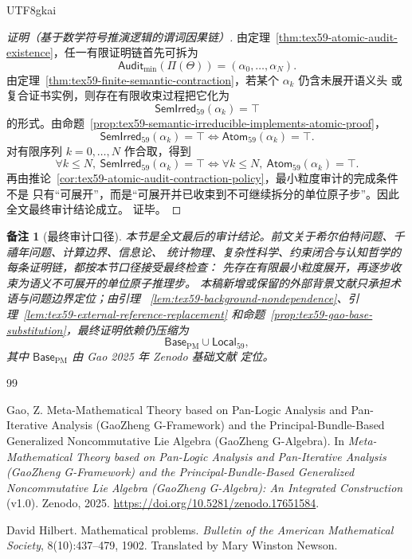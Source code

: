 \documentclass[12pt]{article}
\newtheorem{remark}{备注}[section]
\begin{document}
\begin{CJK*}{UTF8}{gkai}
\begin{proof}[证明（基于数学符号推演逻辑的谓词因果链）]
由定理~\ref{thm:tex59-atomic-audit-existence}，任一有限证明链首先可拆为
\[
  \mathsf{Audit}_{\min}(\Pi(\Theta))
  =
  (\alpha_0,\ldots,\alpha_N).
\]
由定理~\ref{thm:tex59-finite-semantic-contraction}，若某个 \(\alpha_k\) 仍含未展开语义头
或复合证书实例，则存在有限收束过程把它化为
\[
  \mathsf{SemIrred}_{59}(\alpha_k)=\top
\]
的形式。由命题~\ref{prop:tex59-semantic-irreducible-implements-atomic-proof}，
\[
  \mathsf{SemIrred}_{59}(\alpha_k)=\top
  \Longleftrightarrow
  \mathsf{Atom}_{59}(\alpha_k)=\top.
\]
对有限序列 \(k=0,\ldots,N\) 作合取，得到
\[
  \forall k\le N,\ 
  \mathsf{SemIrred}_{59}(\alpha_k)=\top
  \Longleftrightarrow
  \forall k\le N,\ 
  \mathsf{Atom}_{59}(\alpha_k)=\top.
\]
再由推论~\ref{cor:tex59-atomic-audit-contraction-policy}，最小粒度审计的完成条件不是
只有“可展开”，而是“可展开并已收束到不可继续拆分的单位原子步”。因此全文最终审计结论成立。
证毕。
\end{proof}

\begin{remark}[最终审计口径]
本节是全文最后的审计结论。前文关于希尔伯特问题、千禧年问题、计算边界、信息论、
统计物理、复杂性科学、约束闭合与认知哲学的每条证明链，都按本节口径接受最终检查：
先存在有限最小粒度展开，再逐步收束为语义不可展开的单位原子推理步。
本稿新增或保留的外部背景文献只承担术语与问题边界定位；由引理
~\ref{lem:tex59-background-nondependence}、引理~\ref{lem:tex59-external-reference-replacement}
和命题~\ref{prop:tex59-gao-base-substitution}，最终证明依赖仍压缩为
\[
  \mathsf{Base}_{\mathrm{PM}}\cup\mathsf{Local}_{59},
\]
其中 \(\mathsf{Base}_{\mathrm{PM}}\) 由 Gao 2025 年 Zenodo 基础文献
\cite{Gao2025PureMathZenodo} 定位。
\end{remark}

\begin{thebibliography}{99}
\raggedright

Gao, Z.
\newblock Meta-Mathematical Theory based on Pan-Logic Analysis and
Pan-Iterative Analysis (GaoZheng G-Framework) and the
Principal-Bundle-Based Generalized Noncommutative Lie Algebra
(GaoZheng G-Algebra).
\newblock In \emph{Meta-Mathematical Theory based on Pan-Logic Analysis and
Pan-Iterative Analysis (GaoZheng G-Framework) and the
Principal-Bundle-Based Generalized Noncommutative Lie Algebra
(GaoZheng G-Algebra): An Integrated Construction} (v1.0).
\newblock Zenodo, 2025.
\newblock \url{https://doi.org/10.5281/zenodo.17651584}.

David Hilbert.
\newblock Mathematical problems.
\newblock \emph{Bulletin of the American Mathematical Society}, 8(10):437--479, 1902.
\newblock Translated by Mary Winston Newson.


\end{thebibliography}
\end{CJK*}
\end{document}
